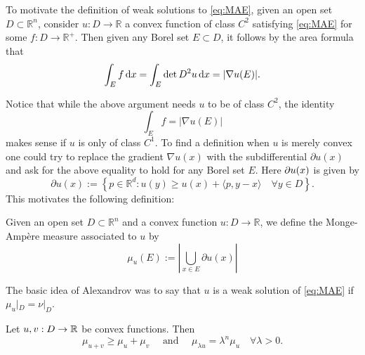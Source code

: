 To motivate the definition of weak solutions to \eqref{eq:MAE}, given an open set $D \subset \mathbb{R}^n$, consider $u: D \rightarrow \mathbb{R}$ a convex function of class $C^2$ satisfying \eqref{eq:MAE} 
	for some $f: D \rightarrow \mathbb{R}^{+}$. Then given any Borel set $E \subset D$, it follows by the area formula that
	$$
	\int_E f \,\text{\rm{d}} x=\int_E \operatorname{det} D^2 u\, \text{\rm{d}} x=|\nabla u(E)| .
	$$
	
	Notice that while the above argument needs $u$ to be of class $C^2$, the identity
	$$
	\int_E f=|\nabla u(E)|
	$$
	makes sense if $u$ is only of class $C^1$. To find a definition when $u$ is merely convex one could try to replace the gradient $\nabla u(x)$ with the subdifferential $\partial u(x)$ and ask for the above equality to hold for any Borel set $E$. Here $\partial u(x)$ is given by 
	$$
	\partial u(x):=\left\{p \in \mathbb{R}^d: u(y) \geq u(x)+\langle p, y-x\rangle \quad \forall y \in D\right\}. 
	$$
	This motivates the following definition:
	\begin{definition}
		Given an open set $D \subset \mathbb{R}^n$ and a convex function $u: D \rightarrow \mathbb{R}$, we define the Monge-Ampère measure associated to $u$ by
		$$
		\mu_u(E):=\left|\bigcup_{x \in E} \partial u(x)\right|
		$$
	\end{definition}
	The basic idea of Alexandrov was to say that $u$ is a weak solution
	of \eqref{eq:MAE} if $\mu_u|_{D}=\nu|_{D}$. 
	
	\begin{lemma}
		Let $u,v:D\to {\mathbb R}$ be convex functions. Then 
		$$
		\mu_{u+v} \geq \mu_u+\mu_v \quad \text { and } \quad \mu_{\lambda u}=\lambda^n \mu_u \quad \forall \lambda>0 .
		$$
	\end{lemma}
	
	\medspace
	
